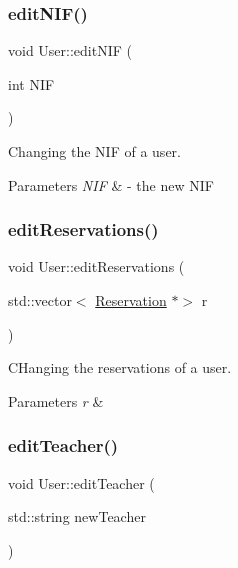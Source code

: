 \subsubsection{\texorpdfstring{edit\+N\+I\+F()}{editNIF()}}
{\footnotesize\ttfamily void User\+::edit\+N\+IF (\begin{DoxyParamCaption}\item[{int}]{N\+IF }\end{DoxyParamCaption})}



Changing the N\+IF of a user. 


\begin{DoxyParams}{Parameters}
{\em N\+IF} & -\/ the new N\+IF \\
\hline
\end{DoxyParams}
\mbox{\label{class_user_a0f8f72211ae7a56e413ad70358f96a19}} 
\subsubsection{\texorpdfstring{edit\+Reservations()}{editReservations()}}
{\footnotesize\ttfamily void User\+::edit\+Reservations (\begin{DoxyParamCaption}\item[{std\+::vector$<$ \mbox{\hyperlink{class_reservation}{Reservation}} $\ast$$>$}]{r }\end{DoxyParamCaption})}



C\+Hanging the reservations of a user. 


\begin{DoxyParams}{Parameters}
{\em r} & \\
\hline
\end{DoxyParams}
\mbox{\label{class_user_a3161559f3e7b4c29b8a60a51f3d002ad}} 
\subsubsection{\texorpdfstring{edit\+Teacher()}{editTeacher()}}
{\footnotesize\ttfamily void User\+::edit\+Teacher (\begin{DoxyParamCaption}\item[{std\+::string}]{new\+Teacher }\end{DoxyParamCaption})}




